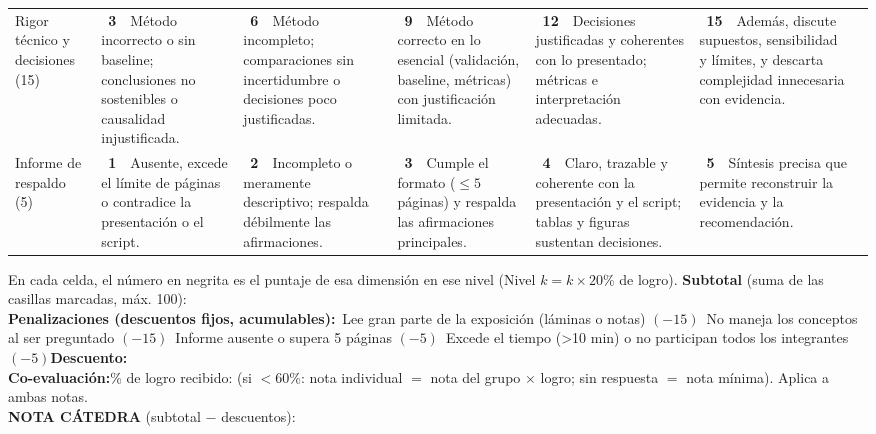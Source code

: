 \documentclass[11pt,letterpaper]{article}
\newcommand{\chk}{\framebox[0.42cm]{\rule{0pt}{0.30cm}}}
\begin{document}
\begin{tabular}{p{2.4cm} p{3.15cm} p{3.15cm} p{3.15cm} p{3.15cm} p{3.15cm} p{1.2cm}}
Rigor técnico y decisiones (15) & \chk\ \textbf{3}~~Método incorrecto o sin baseline; conclusiones no sostenibles o causalidad injustificada. & \chk\ \textbf{6}~~Método incompleto; comparaciones sin incertidumbre o decisiones poco justificadas. & \chk\ \textbf{9}~~Método correcto en lo esencial (validación, baseline, métricas) con justificación limitada. & \chk\ \textbf{12}~~Decisiones justificadas y coherentes con lo presentado; métricas e interpretación adecuadas. & \chk\ \textbf{15}~~Además, discute supuestos, sensibilidad y límites, y descarta complejidad innecesaria con evidencia. & \rule{0pt}{0.7cm} \\
Informe de respaldo (5) & \chk\ \textbf{1}~~Ausente, excede el límite de páginas o contradice la presentación o el script. & \chk\ \textbf{2}~~Incompleto o meramente descriptivo; respalda débilmente las afirmaciones. & \chk\ \textbf{3}~~Cumple el formato ($\leq 5$ páginas) y respalda las afirmaciones principales. & \chk\ \textbf{4}~~Claro, trazable y coherente con la presentación y el script; tablas y figuras sustentan decisiones. & \chk\ \textbf{5}~~Síntesis precisa que permite reconstruir la evidencia y la recomendación. & \rule{0pt}{0.7cm} \\
\bottomrule
\end{tabular}

\vspace{0.2cm}
{\small
En cada celda, el número en negrita es el puntaje de esa dimensión en ese nivel (Nivel $k = k\times 20\%$ de logro). \textbf{Subtotal} (suma de las casillas marcadas, máx. 100): \underline{\hspace{2cm}}\\[0.2cm]
\textbf{Penalizaciones (descuentos fijos, acumulables):}\quad \chk\ Lee gran parte de la exposición (láminas o notas) $(-15)$\quad \chk\ No maneja los conceptos al ser preguntado $(-15)$\quad \chk\ Informe ausente o supera 5 páginas $(-5)$\quad \chk\ Excede el tiempo (>10 min) o no participan todos los integrantes $(-5)$\quad \textbf{Descuento:} \underline{\hspace{1.6cm}}\\[0.2cm]
\textbf{Co-evaluación:}\quad \% de logro recibido: \underline{\hspace{1.8cm}}\quad (si $<60\%$: nota individual $=$ nota del grupo $\times$ logro; sin respuesta $=$ nota mínima). Aplica a ambas notas.\\[0.2cm]
\textbf{NOTA CÁTEDRA} (subtotal $-$ descuentos): \underline{\hspace{2.2cm}}
}
\end{document}
